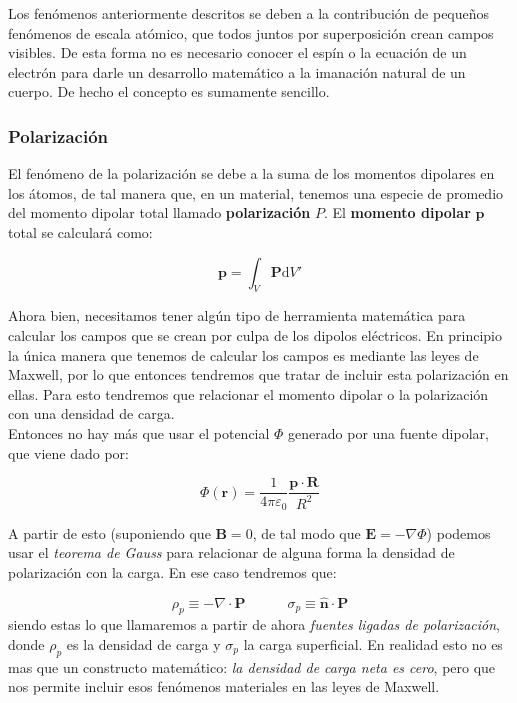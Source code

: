 \documentclass[12pt,a4paper]{article}
\newcommand{\D}{\mathrm{d}}
\newcommand{\tquad}{\quad \quad \quad}
\newcommand{\dive}{\nabla \cdot}
\newcommand{\Bn}{\mathbf{B}}
\newcommand{\En}{\mathbf{E}}
\newcommand{\rn}{\mathbf{r}}
\newcommand{\Pn}{\mathbf{P}}
\newcommand{\pn}{\mathbf{p}}
\newcommand{\Rn}{\mathbf{R}}
\newcommand{\hnn}{\hat{\mathbf{n}}}
\numberwithin{equation}{section}
\numberwithin{figure}{section}
\begin{document}
Los fenómenos anteriormente descritos se deben a la contribución de pequeños fenómenos de escala atómico, que todos juntos por superposición crean campos visibles. De esta forma no es necesario conocer el espín o la ecuación de un electrón para darle un desarrollo matemático a la imanación natural de un cuerpo. De hecho el concepto es sumamente sencillo. \\

\subsubsection{Polarización}
 
El fenómeno de la polarización se debe a la suma de los momentos dipolares en los átomos, de tal manera que, en un material, tenemos una especie de promedio del momento dipolar total llamado \textbf{polarización} $P$. El \textbf{momento dipolar} $\pn$ total se calculará como:

\begin{equation}
\pn = \int_V \Pn \D V'
\end{equation}

Ahora bien, necesitamos tener algún tipo de herramienta matemática para calcular los campos que se crean por culpa de los dipolos eléctricos. En principio la única manera que tenemos de calcular los campos es mediante las leyes de Maxwell, por lo que entonces tendremos que tratar de incluir esta polarización en ellas. Para esto tendremos que relacionar el momento dipolar o la polarización con una densidad de carga. \\

Entonces no hay más que usar el potencial $\Phi$ generado por una fuente dipolar, que viene dado por:

\begin{equation}
\Phi (\rn) = \dfrac{1}{4 \pi \varepsilon_0} \dfrac{\pn \cdot \Rn}{R^2}
\end{equation}

A partir de esto (suponiendo que $\Bn=0$, de tal modo que $\En = - \nabla \Phi$) podemos usar el \textit{teorema de Gauss} para relacionar de alguna forma la densidad de polarización con la carga. En ese caso tendremos que:

\begin{equation}
\rho_p \equiv - \dive \Pn \tquad \sigma_p \equiv \hnn \cdot \Pn
\end{equation}
siendo estas lo que llamaremos a partir de ahora \textit{fuentes ligadas de polarización}, donde $\rho_p$ es la densidad de carga y $\sigma_p$ la carga superficial. En realidad esto no es mas que un constructo matemático: \textit{la densidad de carga neta es cero}, pero que nos permite incluir esos fenómenos materiales en las leyes de Maxwell. \\
\end{document}
